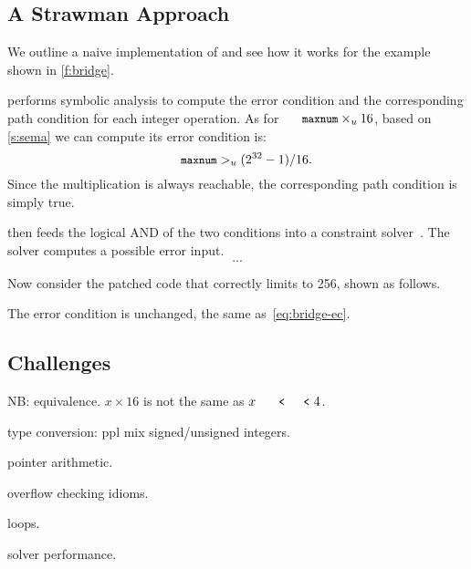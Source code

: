 \subsection{A Strawman Approach}

We outline a naive implementation of \sys and see how it works
for the example shown in \autoref{f:bridge}.

\sys performs symbolic analysis to compute the error condition and
the corresponding path condition for each integer operation.  As
for $\cc{maxnum} \times_u 16$, based on \autoref{s:sema}
we can compute its error condition is:
\begin{equation}\label{eq:bridge-ec}
\cc{maxnum} >_u (2^{32} - 1) / 16.
\end{equation}
Since the multiplication is always reachable, the corresponding
path condition is simply true.

\sys then feeds the logical AND of the two conditions into a
constraint solver~\cite{boolector}.  The solver computes a possible
error input.
\begin{equation*}
...
\end{equation*}

Now consider the patched code that correctly limits  to 256,
shown as follows.

The error condition is unchanged, the same as~\eqref{eq:bridge-ec}.

\subsection{Challenges}

NB: equivalence.
$x \times 16$ is not the same as $x \shl 4$.

type conversion: ppl mix signed/unsigned integers.

pointer arithmetic.

overflow checking idioms.

loops.

solver performance.
